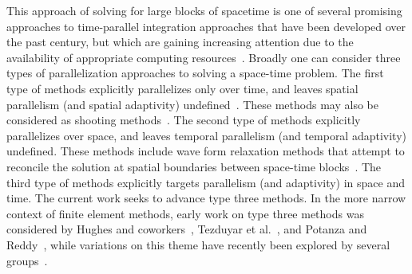 This approach of solving for large blocks of spacetime is one of several promising approaches to time-parallel integration approaches that have been developed over the past century, but which are gaining increasing attention due to the availability of appropriate computing resources~\cite{50Years}. Broadly one can consider three types of parallelization approaches to solving a space-time problem. The first type of methods explicitly parallelizes only over time, and leaves spatial parallelism (and spatial adaptivity) undefined~\cite{parareal2001,falgout2014parallel}. These methods may also be considered as shooting methods~\cite{50Years}. The second type of methods explicitly parallelizes over space, and leaves temporal parallelism (and temporal adaptivity) undefined. These methods include wave form relaxation methods that attempt to reconcile the solution at spatial boundaries between space-time blocks~\cite{50Years}. The third type of methods explicitly targets parallelism (and adaptivity) in space and time. The current work seeks to advance type three methods. In the more narrow context of finite element methods, early work on type three methods was considered by Hughes and coworkers~\cite{hughes1996space,hughes1988space}, Tezduyar et al.~\cite{tezduyar2006space}, and Potanza and Reddy~\cite{pontaza2003spectral}, while variations on this theme have recently been explored by several groups~\cite{behr2008simplex, carey2010blockwise, lowrie1998space, mani2011efficient, rendall2012conservative, wang2015high}. 


